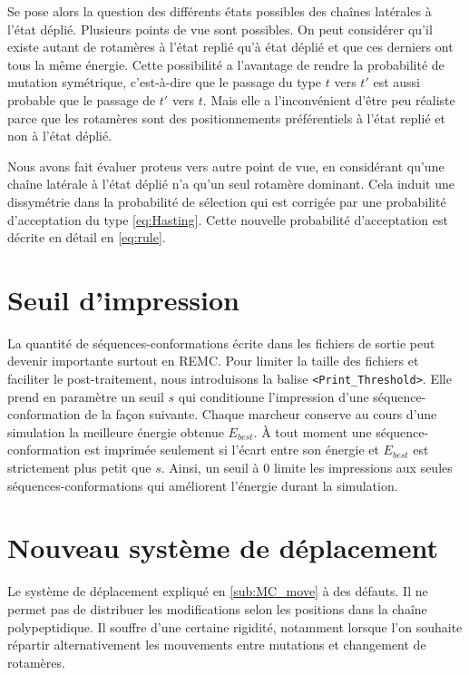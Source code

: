    Se pose alors la question des différents états possibles des chaînes latérales à l'état déplié. Plusieurs points de vue sont possibles. On peut considérer qu'il existe autant de rotamères à l'état replié qu'à état déplié et que ces derniers ont tous la même énergie. Cette possibilité a l'avantage de rendre la probabilité de mutation symétrique, c'est-à-dire que le passage du type $t$ vers $t'$ est aussi probable que le passage de $t'$ vers $t$. Mais elle a l'inconvénient d'être peu réaliste parce que les rotamères sont des positionnements préférentiels à l'état replié et non à l'état déplié.

   Nous avons fait évaluer proteus vers autre point de vue, en considérant qu'une chaîne latérale à l'état déplié n'a qu'un seul rotamère dominant. Cela induit une dissymétrie dans la probabilité de sélection qui est corrigée par une probabilité d'acceptation du type \ref{eq:Hasting}. Cette nouvelle probabilité d'acceptation est décrite en détail en \ref{eq:rule}.

   \section{Seuil d'impression}
\label{sec:dev}
La quantité de séquences-conformations écrite dans les fichiers de sortie peut devenir importante surtout en REMC. Pour limiter la taille des fichiers et faciliter le post-traitement, nous introduisons la balise    \verb!<Print_Threshold>!. Elle prend en paramètre un seuil $s$ qui conditionne l'impression d'une séquence-conformation de la façon suivante. Chaque marcheur conserve au cours d'une simulation la meilleure énergie obtenue $E_{best}$. À tout moment une séquence-conformation est imprimée seulement si l'écart entre son énergie et $E_{best}$  est strictement plus petit que $s$. Ainsi, un seuil à $0$ limite les impressions aux seules séquences-conformations qui améliorent l'énergie durant la simulation.

\section{Nouveau système de déplacement}

Le système de déplacement expliqué en \ref{sub:MC_move}  à des défauts. Il ne permet pas de distribuer les modifications selon les positions dans la chaîne polypeptidique. Il souffre d'une certaine rigidité, notamment lorsque l'on souhaite répartir alternativement les mouvements entre mutations et changement de rotamères.

